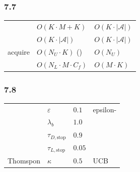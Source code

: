 \documentclass[
  12pt,
]{article}
\begin{document}
\subsubsection{7.7 }\label{ux8ba1ux7b97ux590dux6742ux5ea6-6}

\begin{longtable}[]{@{}lll@{}}
\toprule\noalign{}
 &  &  \\
\midrule\noalign{}
\endhead
\bottomrule\noalign{}
\endlastfoot
 & \(O(K \cdot M + K)\) & \(O(K \cdot |\mathcal{A}|)\) \\
 & \(O(K \cdot |\mathcal{A}|)\) &
\(O(K \cdot |\mathcal{A}|)\) \\
 acquire & \(O(N_U \cdot K)\) () & \(O(N_U)\) \\
 & \(O(N_L \cdot M \cdot C_f)\) & \(O(M \cdot K)\) \\
\end{longtable}

\subsubsection{7.8 }\label{ux5173ux952eux8d85ux53c2ux6570-6}

\begin{longtable}[]{@{}
  >{\raggedright\arraybackslash}p{}
  >{\raggedright\arraybackslash}p{}
  >{\raggedright\arraybackslash}p{}
  >{\raggedright\arraybackslash}p{}@{}}
\toprule\noalign{}
\begin{minipage}[b]{\linewidth}\raggedright

\end{minipage} & \begin{minipage}[b]{\linewidth}\raggedright

\end{minipage} & \begin{minipage}[b]{\linewidth}\raggedright

\end{minipage} & \begin{minipage}[b]{\linewidth}\raggedright

\end{minipage} \\
\midrule\noalign{}
\endhead
\bottomrule\noalign{}
\endlastfoot
 & \(\varepsilon\) & \(0.1\) & epsilon- \\
 & \(\lambda_b\) & \(1.0\) &  \\
 & \(\tau_{D,\text{stop}}\) & \(0.9\) &
 \\
 & \(\tau_{L,\text{stop}}\) & \(0.05\) &
 \\
Thomspon  & \(\kappa\) & \(0.5\) & UCB  \\
\end{longtable}
\end{document}
